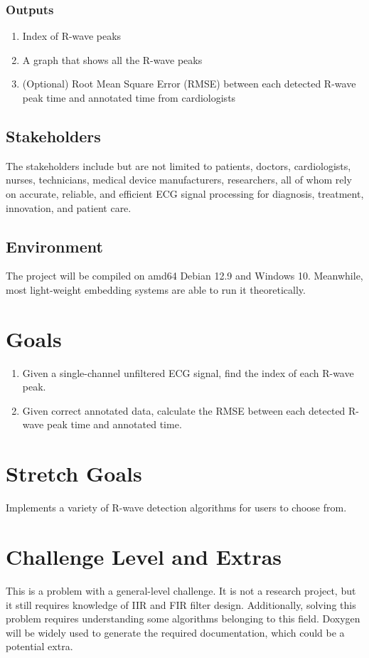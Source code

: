 \documentclass{article}
\begin{document}
\subsubsection{Outputs}

\begin{enumerate}
    \item Index of R-wave peaks
    \item A graph that shows all the R-wave peaks
    \item (Optional) Root Mean Square Error (RMSE) between each detected R-wave peak time and annotated time from cardiologists
\end{enumerate}

\subsection{Stakeholders}

The stakeholders include but are not limited to patients, doctors, cardiologists, nurses, technicians, medical device manufacturers, researchers, all of whom rely on accurate, reliable, and efficient ECG signal processing for diagnosis, treatment, innovation, and patient care.

\subsection{Environment}

The project will be compiled on amd64 Debian 12.9 and Windows 10. Meanwhile, most light-weight embedding systems are able to run it theoretically.

\section{Goals}

\begin{enumerate}
    \item Given a single-channel unfiltered ECG signal, find the index of each R-wave peak.
    \item Given correct annotated data, calculate the RMSE between each detected R-wave peak time and annotated time.
\end{enumerate}

\section{Stretch Goals}

Implements a variety of R-wave detection algorithms for users to choose from.

\section{Challenge Level and Extras}

This is a problem with a general-level challenge. It is not a research project, but it still requires knowledge of IIR and FIR filter design. Additionally, solving this problem requires understanding some algorithms belonging to this field. Doxygen will be widely used to generate the required documentation, which could be a potential extra.
\end{document}
